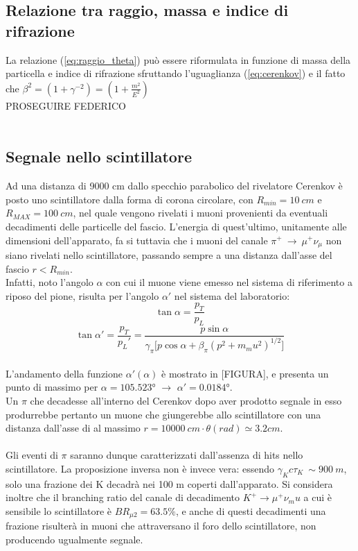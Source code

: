 \documentclass[8pt]{extarticle}
\begin{document}
\subsection{Relazione tra raggio, massa e indice di rifrazione}
La relazione (\ref{eq:raggio_theta}) può essere riformulata in funzione di massa della particella e indice di rifrazione sfruttando l'uguaglianza (\ref{eq:cerenkov}) e il fatto che $\beta^2=(1+\gamma^{-2})=(1+\frac{m^2}{E^2})$
\\
PROSEGUIRE FEDERICO
\\
\\
\subsection{Segnale nello scintillatore}
Ad una distanza di 9000 cm dallo specchio parabolico del rivelatore Cerenkov è posto uno scintillatore dalla forma di corona circolare, con $R_{min}=10\ cm$ e $R_{MAX}=100\ cm$, nel quale vengono rivelati i muoni provenienti da eventuali decadimenti delle particelle del fascio.
L'energia di quest'ultimo, unitamente alle dimensioni dell'apparato, fa si tuttavia che i muoni del canale $\pi^+ \ \rightarrow \ \mu^+ \nu_\mu$ non siano rivelati nello scintillatore, passando sempre a una distanza dall'asse del fascio $r<R_{min}$. \\
Infatti, noto l'angolo $\alpha$ con cui il muone viene emesso nel sistema di riferimento a riposo del pione, risulta per l'angolo $\alpha'$ nel sistema del laboratorio:
\begin{equation}
\tan{\alpha}=\frac{p_T}{p_L}
\end{equation}
\begin{equation}
\tan{\alpha'}=\frac{p_T}{p_L'}=\frac{p\sin{\alpha}}{\gamma_{\pi}\big[p\cos{\alpha}+\beta_{\pi} (p^2+m_mu^2)^{1/2}\big]}
\end{equation}
\\
L'andamento della funzione $\alpha'(\alpha)$ è mostrato in [FIGURA], e presenta un punto  di massimo per $	\alpha=105.523°$ $\rightarrow$ $\alpha'=0.0184°$.\\
Un $\pi$ che decadesse all'interno del Cerenkov dopo aver prodotto segnale in esso produrrebbe pertanto un muone che giungerebbe allo scintillatore con una distanza dall'asse di al massimo $r=10000\ cm \cdot \theta (rad) \simeq 3.2 cm$.\\
\\
Gli eventi di $\pi$ saranno dunque caratterizzati dall'assenza di hits nello scintillatore. La proposizione inversa non è invece vera: essendo $\gamma_K c \tau_K \ \sim 900 \ m$, solo una frazione dei K decadrà nei 100 m coperti dall'apparato. Si considera inoltre che il branching ratio del canale di decadimento $K^+ \rightarrow \mu^+\nu_mu$ a cui è sensibile lo scintillatore è $BR_{\mu 2}=63.5\%$, e anche di questi decadimenti una frazione risulterà in muoni che attraversano il foro dello scintillatore, non producendo ugualmente segnale.
\\
\end{document}
